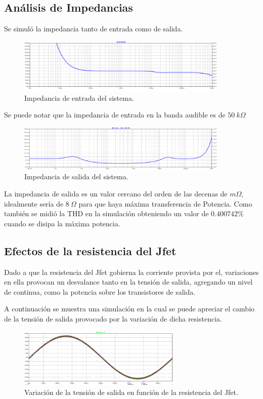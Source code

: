 \subsection{Análisis de Impedancias}
Se simuló la impedancia tanto de entrada como de salida.
\begin{figure}[H]
	\centering
	\includegraphics[width=0.9\textwidth]{ImagenesSimulaciones/Zin.png}
	\caption{Impedancia de entrada del sistema.}
	\label{fig:zin}
\end{figure}
Se puede notar que la impedancia de entrada en la banda audible es de $50 \ k\Omega$
\begin{figure}[H]
	\centering
	\includegraphics[width=0.9\textwidth]{ImagenesSimulaciones/Zout.png}
	\caption{Impedancia de salida del sistema.}
	\label{fig:zout}
\end{figure}
La impedancia de salida es un valor cercano del orden de las decenas de $m\Omega$, idealmente sería de $8 \ \Omega$ para que haya máxima transferencia de Potencia.
Como también se midió la THD en la simulación obteniendo un valor de $0.400742\%$ cuando se disipa la máxima potencia.

\subsection{Efectos de la resistencia del Jfet}
Dado a que la resistencia del Jfet gobierna la corriente provista por el, variaciones en ella provocan un desvalance tanto en la tensión de salida, agregando un nivel de continua, como la potencia sobre los transistores de salida.

A continuación se muestra una simulación en la cual se puede apreciar el cambio de la tensión de salida provocado por la variación de dicha resistencia.
 \begin{figure}[H]
\centering
	\includegraphics[width=0.7\textwidth]{ImagenesSimulaciones/jfetvar1.png}
	\caption{Variación de la tensión de salida en función de la resistencia del Jfet.}
	\label{fig:mcvl}
\end{figure}

